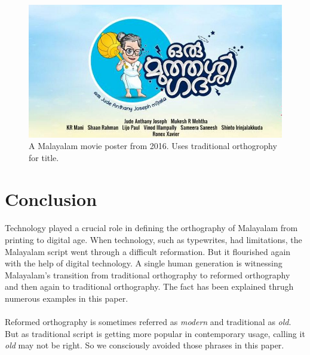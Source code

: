\documentclass[10pt]{article}
\begin{document}
\begin{figure}[H]
 \centering
  \includegraphics[scale=0.4]{images/2016-oru-muthashi-gadha}
 \caption{A Malayalam movie poster from 2016. Uses traditional orthogrophy for title.}
 \label{muthassi}
\end{figure}


\section{Conclusion}
\paragraph{}
Technology played a crucial role in defining the orthography of Malayalam from printing to digital age. When technology, such as typewrites, had limitations, the Malayalam script went through a difficult reformation. But it flourished again with the help of digital technology. A single human generation is witnessing Malayalam's transition from traditional orthography to reformed orthography and then again to traditional orthography. The fact has been explained thrugh numerous examples in this paper.

\paragraph{}
Reformed orthography is sometimes referred as \textit{modern} and traditional as \textit{old}. But as traditional script is getting more popular in contemporary usage, calling it \textit{old} may not be right. So we consciously avoided those phrases in this paper.
\end{document}
